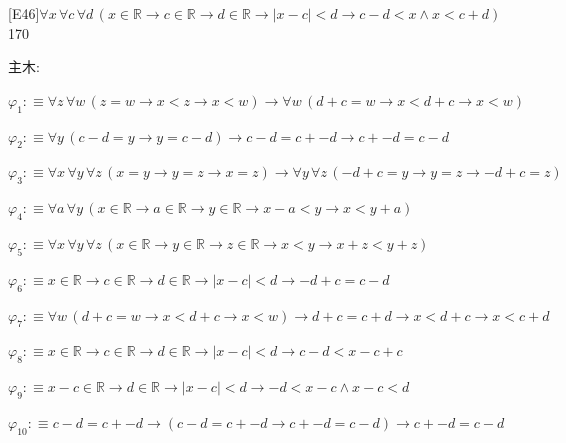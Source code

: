 \begin{fullproof}{[E46]}{$\forall x\,\forall c\,\forall d\,(x \in \mathbb{R} \to c \in \mathbb{R} \to d \in \mathbb{R} \to \lvert x - c \rvert < d \to c - d < x \land x < c + d)$}{170}
\begin{ptree}
\end{ptree}
\noindent 主木:
\begin{ptree}
\noLine
{}
\noLine
{}
\end{ptree}
\begin{abbrevlist}
\item $\varphi_{1} :\equiv \forall z\,\forall w\,(z = w \to x < z \to x < w) \to \forall w\,(d + c = w \to x < d + c \to x < w)$
\item $\varphi_{2} :\equiv \forall y\,(c - d = y \to y = c - d) \to c - d = c + -d \to c + -d = c - d$
\item $\varphi_{3} :\equiv \forall x\,\forall y\,\forall z\,(x = y \to y = z \to x = z) \to \forall y\,\forall z\,(-d + c = y \to y = z \to -d + c = z)$
\item $\varphi_{4} :\equiv \forall a\,\forall y\,(x \in \mathbb{R} \to a \in \mathbb{R} \to y \in \mathbb{R} \to x - a < y \to x < y + a)$
\item $\varphi_{5} :\equiv \forall x\,\forall y\,\forall z\,(x \in \mathbb{R} \to y \in \mathbb{R} \to z \in \mathbb{R} \to x < y \to x + z < y + z)$
\item $\varphi_{6} :\equiv x \in \mathbb{R} \to c \in \mathbb{R} \to d \in \mathbb{R} \to \lvert x - c \rvert < d \to -d + c = c - d$
\item $\varphi_{7} :\equiv \forall w\,(d + c = w \to x < d + c \to x < w) \to d + c = c + d \to x < d + c \to x < c + d$
\item $\varphi_{8} :\equiv x \in \mathbb{R} \to c \in \mathbb{R} \to d \in \mathbb{R} \to \lvert x - c \rvert < d \to c - d < x - c + c$
\item $\varphi_{9} :\equiv x - c \in \mathbb{R} \to d \in \mathbb{R} \to \lvert x - c \rvert < d \to -d < x - c \land x - c < d$
\item $\varphi_{10} :\equiv c - d = c + -d \to (c - d = c + -d \to c + -d = c - d) \to c + -d = c - d$

\end{abbrevlist}
\end{fullproof}
